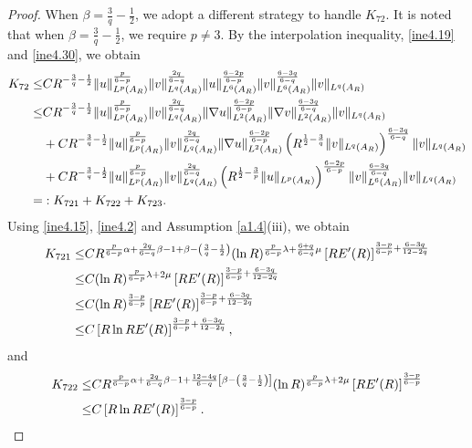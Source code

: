 \documentclass[11pt,reqno]{amsart}
\numberwithin{Thm}{section}
\begin{document}
\begin{proof}
When $\beta=\frac{3}{q}-\frac{1}{2}$, we adopt a different strategy to handle $K_{72}$. It is noted that when $\beta=\frac{3}{q}-\frac{1}{2}$, we require $p\neq3$.
By the interpolation inequality, \eqref{ine4.19} and \eqref{ine4.30}, we obtain
\begin{align}\label{ine4.46}
	K_{72} \leq& CR^{-\frac{3}{q}-\frac{1}{2}}\|u\|_{L^p(A_R)}^{\frac{p}{6-p}}\|v\|_{L^q(A_R)}^{\frac{2q}{6-q}} \|u\|_{L^6(A_R)}^{\frac{6-2p}{6-p}}\|v\|_{L^6(A_R)}^{\frac{6-3q}{6-q}} \|v\|_{L^q(A_R)}\notag\\
	\leq &CR^{-\frac{3}{q}-\frac{1}{2}}\|u\|_{L^p(A_R)}^{\frac{p}{6-p}}\|v\|_{L^q(A_R)}^{\frac{2q}{6-q}}\|\nabla u\|_{L^2(A_R)}^{\frac{6-2p}{6-p}}\|\nabla v\|_{L^2(A_R)}^{\frac{6-3q}{6-q}}\|v\|_{L^q(A_R)}\notag\\
&+CR^{-\frac{3}{q}-\frac{1}{2}}\|u\|_{L^p(A_R)}^{\frac{p}{6-p}}\|v\|_{L^q(A_R)}^{\frac{2q}{6-q}}\|\nabla u\|_{L^2(A_R)}^{\frac{6-2p}{6-p}}\left(R^{\frac{1}{2}-\frac{3}{q}} \|v\|_{L^q(A_R)}\right)^{\frac{6-3q}{6-q}}\|v\|_{L^q(A_R)}\\
&+CR^{-\frac{3}{q}-\frac{1}{2}}\|u\|_{L^p(A_R)}^{\frac{p}{6-p}}\|v\|_{L^q(A_R)}^{\frac{2q}{6-q}}\left(R^{\frac{1}{2}-\frac{3}{p}} \|u\|_{L^p(A_R)}\right)^{\frac{6-2p}{6-p}} \|v\|_{L^6(A_R)}^{\frac{6-3q}{6-q}}\|v\|_{L^q(A_R)}\notag\\
=&:K_{721} + K_{722} + K_{723}.\notag
\end{align}
Using \eqref{ine4.15}, \eqref{ine4.2} and Assumption \ref{a1.4}(iii), we obtain
\begin{align}\label{ine4.47}
K_{721}\leq&CR^{\frac{p}{6-p}\alpha+\frac{2q}{6-q}\beta-1+\beta-\left(\frac{3}{q}-\frac{1}{2}\right)}(\ln R)^{\frac{p}{6-p}\lambda+\frac{6+q}{6-q}\mu} \left[RE'(R)\right]^{\frac{3-p}{6-p}+\frac{6-3q}{12-2q}}\notag\\
\leq&C(\ln R)^{\frac{p}{6-p}\lambda+2\mu} \left[RE'(R)\right]^{\frac{3-p}{6-p}+\frac{6-3q}{12-2q}}\notag\\
\leq&C(\ln R)^\frac{3-p}{6-p} \left[RE'(R)\right]^{\frac{3-p}{6-p}+\frac{6-3q}{12-2q}}\\
\leq&C\left[R\ln RE'(R)\right]^{\frac{3-p}{6-p}+\frac{6-3q}{12-2q}},\notag
\end{align}
and
\begin{align}\label{ine4.48}
K_{722}\leq&CR^{\frac{p}{6-p}\alpha+\frac{2q}{6-q}\beta-1+\frac{12-4q}{6-q}\left[\beta-\left(\frac{3}{q}-\frac{1}{2}\right)\right]}(\ln R)^{\frac{p}{6-p}\lambda+2\mu} \left[RE'(R)\right]^{\frac{3-p}{6-p}}\notag\\
\leq&C\left[R\ln RE'(R)\right]^{\frac{3-p}{6-p}}.

\end{align}
\end{proof}
\end{document}
